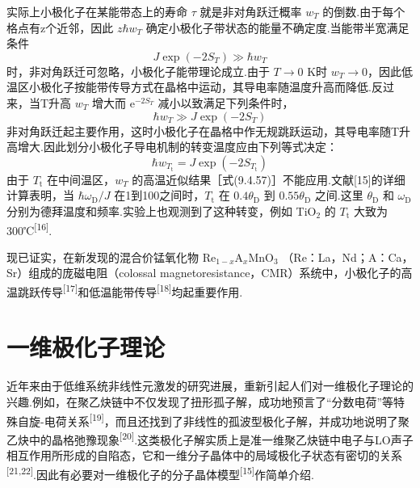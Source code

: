 实际上小极化子在某能带态上的寿命 $\tau$ 就是非对角跃迁概率 $w_{T}$ 的倒数.由于每个格点有z个近邻，因此 $z\hbar w_{T}$ 确定小极化子带状态的能量不确定度.当能带半宽满足条件
\begin{equation}
  J\exp\left(-2S_{T}\right)\gg\hbar w_{T}
\end{equation}
时，非对角跃迁可忽略，小极化子能带理论成立.由于 $T\to0$ K时 $w_{T}\to0$，因此低温区小极化子按能带传导方式在晶格中运动，其导电率随温度升高而降低.反过来，当T升高 $w_{T}$ 增大而 $\mathrm{e}^{-2S_{T}}$ 减小以致满足下列条件时，
\begin{equation}
  \hbar w_{T}\gg J\exp\left(-2S_{T}\right)
\end{equation}
非对角跃迁起主要作用，这时小极化子在晶格中作无规跳跃运动，其导电率随T升高增大.因此划分小极化子导电机制的转变温度应由下列等式决定：
\begin{equation*}
  \hbar w_{T_{\mathrm t}}=J\exp\left(-2S_{T_{\mathrm t}}\right)
\end{equation*}
由于 $T_{\mathrm t}$ 在中间温区，$w_{T}$ 的高温近似结果［式(9.4.57)］不能应用.文献[15]的详细计算表明，当 $\hbar\omega_{\mathrm D}/J$ 在1到100之间时，$T_{\mathrm t}$ 在 $0.4\theta_{\mathrm D}$ 到 $0.55\theta_{\mathrm D}$ 之间.这里 $\theta_{\mathrm D}$ 和 $\omega_{\mathrm D}$ 分别为德拜温度和频率.实验上也观测到了这种转变，例如 TiO$_{2}$ 的 $T_{\mathrm t}$ 大致为300℃\textsuperscript{[16]}.

现已证实，在新发现的混合价锰氧化物
$\mathrm{Re}_{1-x}\mathrm{A}_{x}\mathrm{MnO}_{3}$
（Re：La，Nd；A：Ca，Sr）组成的庞磁电阻（colossal magnetoresistance，CMR）系统中，小极化子的高温跳跃传导\textsuperscript{[17]}和低温能带传导\textsuperscript{[18]}均起重要作用.

\section{一维极化子理论}

近年来由于低维系统非线性元激发的研究进展，重新引起人们对一维极化子理论的兴趣.例如，在聚乙炔链中不仅发现了扭形孤子解，成功地预言了“分数电荷”等特殊自旋-电荷关系\textsuperscript{[19]}，而且还找到了非线性的孤波型极化子解，并成功地说明了聚乙炔中的晶格弛豫现象\textsuperscript{[20]}.这类极化子解实质上是准一维聚乙炔链中电子与LO声子相互作用所形成的自陷态，它和一维分子晶体中的局域极化子状态有密切的关系\textsuperscript{[21,22]}.因此有必要对一维极化子的分子晶体模型\textsuperscript{[15]}作简单介绍.

